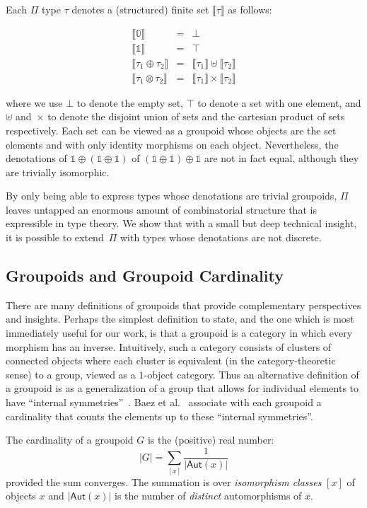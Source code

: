 \documentclass[a4paper,USenglish]{lipics-v2016-utf8x}
\newcommand{\zt}{\mathbb{0}}
\newcommand{\ot}{\mathbb{1}}
\newcommand{\sem}[1]{\llbracket #1 \rrbracket}
\begin{document}
Each $\Pi$ type $\tau$ denotes a (structured) finite set $\sem{\tau}$ as follows:

\[\begin{array}{rcl}
\sem{\zt} &=& \bot \\
\sem{\ot} &=& \top \\
\sem{\tau_1 \oplus \tau_2} &=& \sem{\tau_1} \uplus \sem{\tau_2} \\
\sem{\tau_1 \otimes \tau_2} &=& \sem{\tau_1} \times \sem{\tau_2}
\end{array}\]

\noindent where we use $\bot$ to denote the empty set, $\top$ to denote a set
with one element, and $\uplus$ and~$\times$ to denote the disjoint union of sets
and the cartesian product of sets respectively. Each set can be viewed as a
groupoid whose objects are the set elements and with only identity morphisms on
each object. Nevertheless, the denotations of $\ot \oplus (\ot \oplus \ot)$ of
$(\ot \oplus \ot) \oplus \ot$ are not in fact equal, although they are
trivially isomorphic.

By only being able to express types whose denotations are trivial
groupoids, $\Pi$ leaves untapped an enormous amount of combinatorial structure
that is expressible in type theory. We show that with a small but deep technical
insight, it is possible to extend~$\Pi$ with types whose denotations are
not discrete.

\subsection{Groupoids and Groupoid Cardinality}

There are many definitions of groupoids that provide complementary perspectives
and insights. Perhaps the simplest definition to state, and the one which is
most immediately useful for our work, is that a groupoid is a category
in which every morphism has an inverse. Intuitively, such a category consists of
clusters of connected objects where each cluster is equivalent (in the
category-theoretic sense) to a group, viewed as a $1$-object category. Thus an
alternative definition of a groupoid is as a generalization of a group that
allows for individual elements
to have ``internal symmetries''~\cite{groupoidintro}. Baez et
al.~\cite{2009arXiv0908.4305B} associate with each groupoid a cardinality that
counts the elements up to these ``internal symmetries''.

\begin{definition}
  The cardinality of a groupoid $G$ is the (positive) real number:
  \[
    |G| = \sum_{[x]} \frac{1}{|\textsf{Aut}(x)|}
  \]
  provided the sum converges. The summation is over \emph{isomorphism classes}
  $[x]$ of objects $x$ and $|\textsf{Aut}(x)|$ is the number of \emph{distinct}
  automorphisms of $x$.
\end{definition}
\end{document}
